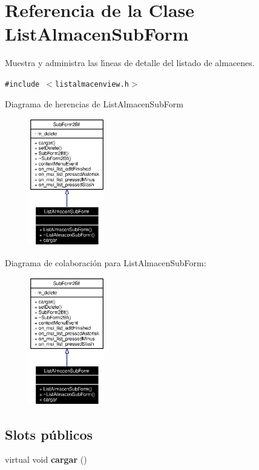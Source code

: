 \section{Referencia de la Clase List\-Almacen\-Sub\-Form}
\label{classListAlmacenSubForm}
Muestra y administra las l\'{\i}neas de detalle del listado de almacenes.  


{\tt \#include $<$listalmacenview.h$>$}

Diagrama de herencias de List\-Almacen\-Sub\-Form\begin{figure}[H]
\begin{center}
\leavevmode
\includegraphics[width=94pt]{classListAlmacenSubForm__inherit__graph}
\end{center}
\end{figure}
Diagrama de colaboraci\'{o}n para List\-Almacen\-Sub\-Form:\begin{figure}[H]
\begin{center}
\leavevmode
\includegraphics[width=94pt]{classListAlmacenSubForm__coll__graph}
\end{center}
\end{figure}
\subsection*{Slots p\'{u}blicos}
\begin{CompactItemize}
\item 
virtual void {\bf cargar} ()\label{classListAlmacenSubForm_i0}

\end{CompactItemize}
